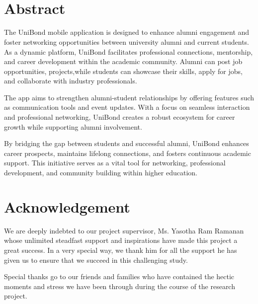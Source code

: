 \documentclass[12pt, a4paper]{report}
\begin{document}
\vspace{2.0em}
\noindent
 \hspace{4in}  \\

\vspace{2.0em}
\noindent
\\

\newpage
\cleardoublepage
{}
\chapter*{Abstract}
The UniBond mobile application is designed to enhance alumni engagement and foster networking opportunities between university alumni and current students. As a dynamic platform, UniBond facilitates professional connections, mentorship, and career development within the academic community. Alumni can post job opportunities, projects,while students can showcase their skills, apply for jobs, and collaborate with industry professionals.

The app aims to strengthen alumni-student relationships by offering features such as communication tools and event updates. With a focus on seamless interaction and professional networking, UniBond creates a robust ecosystem for career growth while supporting alumni involvement.

By bridging the gap between students and successful alumni, UniBond enhances career prospects, maintains lifelong connections, and fosters continuous academic support. This initiative serves as a vital tool for networking, professional development, and community building within higher education.





\newpage
\cleardoublepage
{}
\chapter*{Acknowledgement}
We are deeply indebted to our project supervisor, Ms. Yasotha Ram Ramanan whose unlimited steadfast support and inspirations have made this project a great success. In a very special way, we thank him for all the support he has given us to ensure that we succeed in this challenging study.

Special thanks go to our friends and families who have contained the hectic moments and stress we have been through during the course of the research project.
\end{document}
